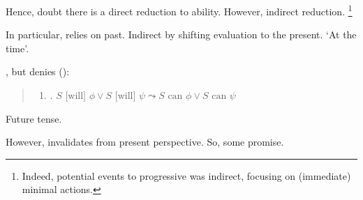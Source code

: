 \begin{note}[Segue]
  Hence, doubt there is a direct reduction to ability.
  However, indirect reduction.%
  \footnote{
    Indeed, potential events to progressive was indirect, focusing on (immediate) minimal actions.
    }

  In particular, \BoyPS{} relies on past.
  Indirect by shifting evaluation to the present.
  `At the time'.
\end{note}

\begin{note}
  \BoyPS{}, but denies \BoyVS{} (\citeyear[\S1.2]{Boylan:2020aa}):
  \begin{quote}
    \begin{enumerate}
    \item
      \label{Boylan:Or-Success}
      \BoyVS{}. \(S\text{ [will] }\phi \lor S\text{ [will] }\psi \leadsto S\text{ can }\phi \lor S\text{ can }\psi\)
    \end{enumerate}
  \end{quote}

  Future tense.

  However, invalidates \BoyPS{} from present perspective.
  So, some promise.
\end{note}


